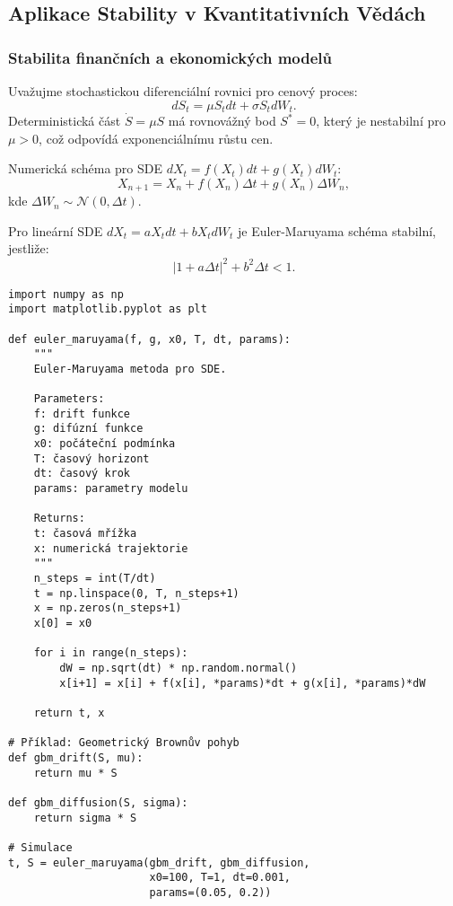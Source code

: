\spc

\subsection{Aplikace Stability v Kvantitativních Vědách}

\subsubsection{Stabilita finančních a ekonomických modelů}

\begin{application}
Uvažujme stochastickou diferenciální rovnici pro cenový proces:
\[
dS_t = \mu S_t dt + \sigma S_t dW_t.
\]
Deterministická část $\dot{S} = \mu S$ má rovnovážný bod $S^* = 0$, který je nestabilní pro $\mu > 0$, což odpovídá exponenciálnímu růstu cen.
\end{application}

\begin{definition}
Numerická schéma pro SDE $dX_t = f(X_t)dt + g(X_t)dW_t$:
\[
X_{n+1} = X_n + f(X_n)\Delta t + g(X_n)\Delta W_n,
\]
kde $\Delta W_n \sim \mathcal{N}(0, \Delta t)$.
\end{definition}

\begin{theorem}
Pro lineární SDE $dX_t = aX_t dt + bX_t dW_t$ je Euler-Maruyama schéma stabilní, jestliže:
\[
|1 + a\Delta t|^2 + b^2\Delta t < 1.
\]
\end{theorem}

\begin{code}
\begin{verbatim}
import numpy as np
import matplotlib.pyplot as plt

def euler_maruyama(f, g, x0, T, dt, params):
    """
    Euler-Maruyama metoda pro SDE.
    
    Parameters:
    f: drift funkce
    g: difúzní funkce  
    x0: počáteční podmínka
    T: časový horizont
    dt: časový krok
    params: parametry modelu
    
    Returns:
    t: časová mřížka
    x: numerická trajektorie
    """
    n_steps = int(T/dt)
    t = np.linspace(0, T, n_steps+1)
    x = np.zeros(n_steps+1)
    x[0] = x0
    
    for i in range(n_steps):
        dW = np.sqrt(dt) * np.random.normal()
        x[i+1] = x[i] + f(x[i], *params)*dt + g(x[i], *params)*dW
    
    return t, x

# Příklad: Geometrický Brownův pohyb
def gbm_drift(S, mu):
    return mu * S

def gbm_diffusion(S, sigma):
    return sigma * S

# Simulace
t, S = euler_maruyama(gbm_drift, gbm_diffusion, 
                      x0=100, T=1, dt=0.001, 
                      params=(0.05, 0.2))
\end{verbatim}
\end{code}

